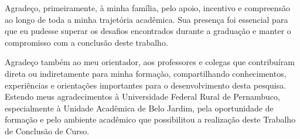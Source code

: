 
\begin{agradecimentos}[AGRADECIMENTOS]

Agradeço, primeiramente, à minha família, pelo apoio, incentivo e compreensão ao longo de toda a minha trajetória acadêmica. Sua presença foi essencial para que eu pudesse superar os desafios encontrados durante a graduação e manter o compromisso com a conclusão deste trabalho.

Agradeço também ao meu orientador, aos professores e colegas que contribuíram direta ou indiretamente para minha formação, compartilhando conhecimentos, experiências e orientações importantes para o desenvolvimento desta pesquisa. Estendo meus agradecimentos à Universidade Federal Rural de Pernambuco, especialmente à Unidade Acadêmica de Belo Jardim, pela oportunidade de formação e pelo ambiente acadêmico que possibilitou a realização deste Trabalho de Conclusão de Curso.

\end{agradecimentos}